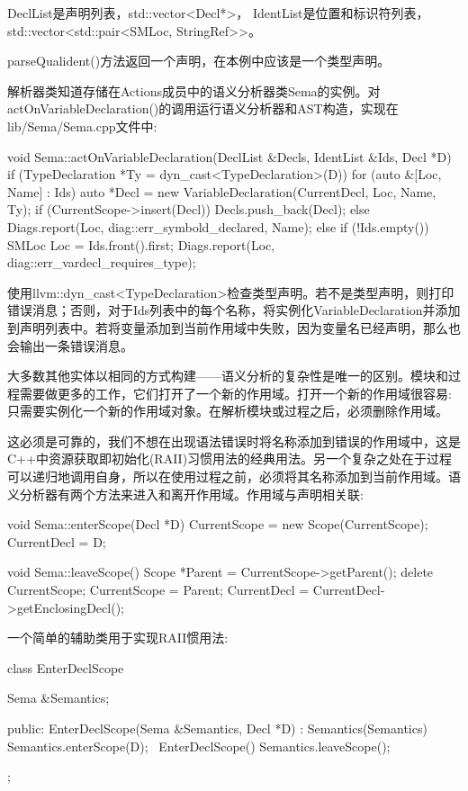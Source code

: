 DeclList是声明列表，std::vector<Decl*>， IdentList是位置和标识符列表，std::vector<std::pair<SMLoc, StringRef>{}>。

parseQualident()方法返回一个声明，在本例中应该是一个类型声明。

解析器类知道存储在Actions成员中的语义分析器类Sema的实例。对actOnVariableDeclaration()的调用运行语义分析器和AST构造，实现在lib/Sema/Sema.cpp文件中:

\begin{cpp}
void Sema::actOnVariableDeclaration(DeclList &Decls,
IdentList &Ids,
Decl *D) {
    if (TypeDeclaration *Ty = dyn_cast<TypeDeclaration>(D)) {
        for (auto &[Loc, Name] : Ids) {
            auto *Decl = new VariableDeclaration(CurrentDecl, Loc,
            Name, Ty);
            if (CurrentScope->insert(Decl))
                Decls.push_back(Decl);
            else
                Diags.report(Loc, diag::err_symbold_declared, Name);
        }
    } else if (!Ids.empty()) {
        SMLoc Loc = Ids.front().first;
        Diags.report(Loc, diag::err_vardecl_requires_type);
    }
}
\end{cpp}

使用llvm::dyn\_cast<TypeDeclaration>检查类型声明。若不是类型声明，则打印错误消息；否则，对于Ids列表中的每个名称，将实例化VariableDeclaration并添加到声明列表中。若将变量添加到当前作用域中失败，因为变量名已经声明，那么也会输出一条错误消息。

大多数其他实体以相同的方式构建——语义分析的复杂性是唯一的区别。模块和过程需要做更多的工作，它们打开了一个新的作用域。打开一个新的作用域很容易:只需要实例化一个新的作用域对象。在解析模块或过程之后，必须删除作用域。

这必须是可靠的，我们不想在出现语法错误时将名称添加到错误的作用域中，这是C++中资源获取即初始化(RAII)习惯用法的经典用法。另一个复杂之处在于过程可以递归地调用自身，所以在使用过程之前，必须将其名称添加到当前作用域。语义分析器有两个方法来进入和离开作用域。作用域与声明相关联:

\begin{cpp}
void Sema::enterScope(Decl *D) {
    CurrentScope = new Scope(CurrentScope);
    CurrentDecl = D;
}

void Sema::leaveScope() {
    Scope *Parent = CurrentScope->getParent();
    delete CurrentScope;
    CurrentScope = Parent;
    CurrentDecl = CurrentDecl->getEnclosingDecl();
}
\end{cpp}

一个简单的辅助类用于实现RAII惯用法:

\begin{cpp}
class EnterDeclScope {
    Sema &Semantics;

public:
    EnterDeclScope(Sema &Semantics, Decl *D)
    : Semantics(Semantics) {
        Semantics.enterScope(D);
    }
    ~EnterDeclScope() { Semantics.leaveScope(); }
};
\end{cpp}

